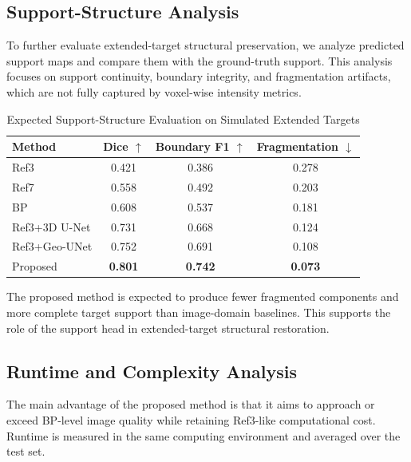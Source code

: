 \documentclass[journal]{IEEEtran}
\begin{document}
\subsection{Support-Structure Analysis}
\label{subsec:support_structure_analysis}

To further evaluate extended-target structural preservation, we analyze predicted support maps and compare them with the ground-truth support. This analysis focuses on support continuity, boundary integrity, and fragmentation artifacts, which are not fully captured by voxel-wise intensity metrics.

\begin{table}[t]
\caption{Expected Support-Structure Evaluation on Simulated Extended Targets}
\label{tab:support_structure}
\centering
\begin{tabular}{lccc}
\hline
Method & Dice $\uparrow$ & Boundary F1 $\uparrow$ & Fragmentation $\downarrow$ \\
\hline
Ref3 & 0.421 & 0.386 & 0.278 \\
Ref7 & 0.558 & 0.492 & 0.203 \\
BP & 0.608 & 0.537 & 0.181 \\
Ref3+3D U-Net & 0.731 & 0.668 & 0.124 \\
Ref3+Geo-UNet & 0.752 & 0.691 & 0.108 \\
Proposed & \textbf{0.801} & \textbf{0.742} & \textbf{0.073} \\
\hline
\end{tabular}
\end{table}

The proposed method is expected to produce fewer fragmented components and more complete target support than image-domain baselines. This supports the role of the support head in extended-target structural restoration.

\subsection{Runtime and Complexity Analysis}
\label{subsec:runtime}

The main advantage of the proposed method is that it aims to approach or exceed BP-level image quality while retaining Ref3-like computational cost. Runtime is measured in the same computing environment and averaged over the test set.
\end{document}
